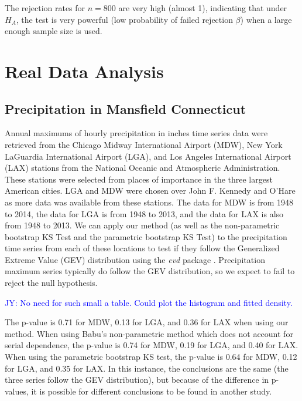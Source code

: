 \documentclass[12pt, titlepage, letterpaper]{article}
\newcommand{\jy}[1]{\textcolor{blue}{JY: #1}}
\newcommand{\mc}[1]{\textcolor{green}{MC: (#1)}}
\begin{document}
{The rejection rates for $n = 800$
are very 
high (almost 1), indicating that under $H_A$, the test is very powerful 
(low probability of failed rejection $\beta$) when a large enough
sample size is used.


\section{Real Data Analysis}
\label{sec:real}

\subsection{Precipitation in Mansfield Connecticut}
\label{sec:precipitation}
Annual maximums of hourly precipitation in inches time series data were 
retrieved 
from the Chicago Midway International Airport (MDW), New York LaGuardia 
International 
Airport (LGA),
and Los Angeles International Airport (LAX) stations from the 
National Oceanic and Atmospheric Administration. These stations were selected 
from places of importance in the three largest American cities. LGA and
MDW were chosen over John F. Kennedy and O'Hare as more data was available
from these stations. The data for MDW is from
1948 to 2014, the data for LGA is from 1948 to 2013, and the
data for LAX is also from 1948 to 2013. We can apply our method (as well
as the non-parametric bootstrap KS Test \citep{babu2004goodness} and
the parametric bootstrap KS Test) to
the precipitation time series from each of these locations to test if they
follow the
Generalized Extreme Value (GEV) distribution using the \textsl{evd} 
package \citep{evd}. Precipitation maximum series 
typically do follow the GEV distribution, so we expect to fail to reject the
null hypothesis.

\jy{No need for such small a table. Could plot the histogram and fitted density.}

%

The p-value is 0.71 for MDW, 0.13 for LGA, and 0.36 for LAX when using our 
method.
When using Babu's non-parametric method which does not account for serial
dependence, the p-value is 0.74 for MDW, 0.19 for LGA, and 0.40 for LAX. 
When using the parametric bootstrap KS test, the p-value is 0.64 for MDW,
0.12 for LGA, and 0.35 for LAX. In this instance, the conclusions are the same 
(the three series follow the GEV distribution), but because of the difference
in p-values, it is possible for different conclusions to be found in another
study.

}
\end{document}
